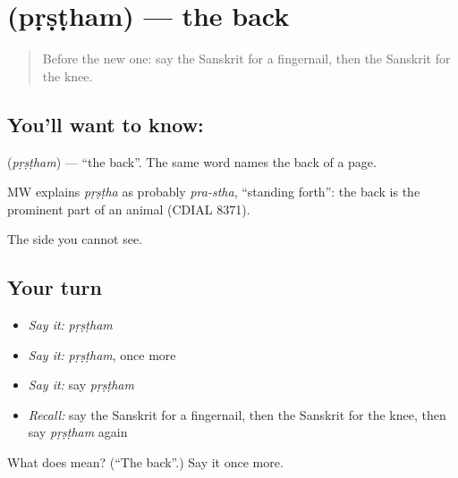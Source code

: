 \section[\texorpdfstring{\sk{पृष्ठम्} (pṛṣṭham)}{पृष्ठम् (pṛṣṭham)}]{ (pṛṣṭham) — the back}

\label{lesson:SA-C70-back}



\begin{quote}
Before the new one: say the Sanskrit for a fingernail, then the Sanskrit for the knee.
\end{quote}

\subsection*{You'll want to know: }
\textbf{} (\emph{pṛṣṭham}) — \textquotedblleft{}the back\textquotedblright{}. The same word names the back of a page.

\begin{cousinweb}
MW explains \emph{pṛṣṭha} as probably \emph{pra-stha}, \textquotedblleft{}standing forth\textquotedblright{}: the back is the prominent part of an animal (CDIAL 8371).
\end{cousinweb}

\begin{grammarlens}[title={What you've built}]
The side you cannot see.
\end{grammarlens}

\subsection*{Your turn}
\begin{itemize}
\raggedright
  \item \emph{Say it:} \emph{pṛṣṭham}
  \item \emph{Say it:} \emph{pṛṣṭham}, once more
  \item \emph{Say it:} say \emph{pṛṣṭham}
  \item \emph{Recall:} say the Sanskrit for a fingernail, then the Sanskrit for the knee, then say \emph{pṛṣṭham} again
\end{itemize}

\begin{tcolorbox}[breakable,colback=teal!4,colframe=teal!35!black,title={Before you move on}]
What does  mean? (\textquotedblleft{}The back\textquotedblright{}.) Say it once more.
\end{tcolorbox}
